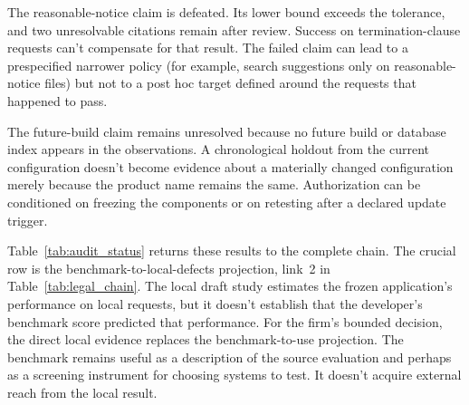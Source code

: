 \documentclass[12pt]{article}
\begin{document}
The reasonable-notice claim is defeated. Its lower bound exceeds the tolerance, and two unresolvable citations remain after review. Success on termination-clause requests can't compensate for that result. The failed claim can lead to a prespecified narrower policy (for example, search suggestions only on reasonable-notice files) but not to a post hoc target defined around the requests that happened to pass.

The future-build claim remains unresolved because no future build or database index appears in the observations. A chronological holdout from the current configuration doesn't become evidence about a materially changed configuration merely because the product name remains the same. Authorization can be conditioned on freezing the components or on retesting after a declared update trigger.

Table~\ref{tab:audit_status} returns these results to the complete chain. The crucial row is the benchmark-to-local-defects projection, link~2 in Table~\ref{tab:legal_chain}. The local draft study estimates the frozen application's performance on local requests, but it doesn't establish that the developer's benchmark score predicted that performance. For the firm's bounded decision, the direct local evidence replaces the benchmark-to-use projection. The benchmark remains useful as a description of the source evaluation and perhaps as a screening instrument for choosing systems to test. It doesn't acquire external reach from the local result.
\end{document}
